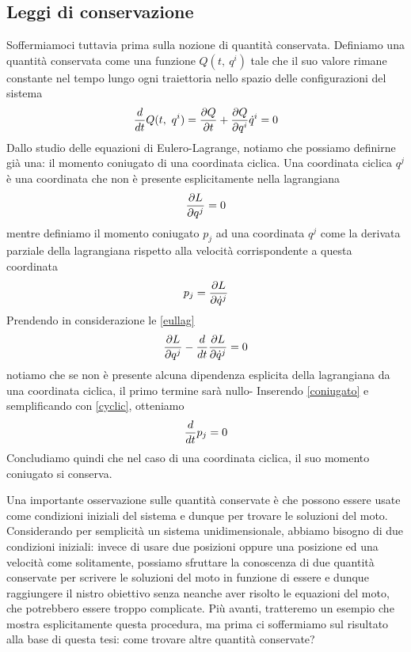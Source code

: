 \subsection{Leggi di conservazione}
    Soffermiamoci tuttavia prima sulla nozione di quantità conservata. Definiamo una quantità conservata come una funzione $Q(t, ~q^i)$ tale che il suo valore rimane constante nel tempo lungo ogni traiettoria nello spazio delle configurazioni del sistema
\begin{equation*}
    \frac{d}{dt} Q(t, ~q^i) = \frac{\partial Q}{\partial t} + \frac{\partial Q}{\partial q^i} \dot q^i = 0
\end{equation*}
    Dallo studio delle equazioni di Eulero-Lagrange, notiamo che possiamo definirne già una: il momento coniugato di una coordinata ciclica. Una coordinata ciclica $q^j$ è una coordinata che non è presente esplicitamente nella lagrangiana
\begin{equation} \label{cyclic}
    \frac{\partial L}{\partial q^j} = 0
\end{equation}
    mentre definiamo il momento coniugato $p_j$ ad una coordinata $q^j$ come la derivata parziale della lagrangiana rispetto alla velocità corrispondente a questa coordinata
\begin{equation} \label{coniugato}
    p_j = \frac{\partial L}{\partial\dot q^j}
\end{equation}
    Prendendo in considerazione le \eqref{eullag}
\begin{equation*}
    \frac{\partial L}{\partial q^j}  - \frac{d}{dt} \frac{\partial L}{\partial\dot q^j} = 0
\end{equation*}
    notiamo che se non è presente alcuna dipendenza esplicita della lagrangiana da una coordinata ciclica, il primo termine sarà nullo- Inserendo \eqref{coniugato} e semplificando con \eqref{cyclic}, otteniamo
\begin{equation*}
    \frac{d}{dt} p_j = 0
\end{equation*}
    Concludiamo quindi che nel caso di una coordinata ciclica, il suo momento coniugato si conserva. 

    Una importante osservazione sulle quantità conservate è che possono essere usate come condizioni iniziali del sistema e dunque per trovare le soluzioni del moto. Considerando per semplicità un sistema unidimensionale, abbiamo bisogno di due condizioni iniziali: invece di usare due posizioni oppure una posizione ed una velocità come solitamente, possiamo sfruttare la conoscenza di due quantità conservate per scrivere le soluzioni del moto in funzione di essere e dunque raggiungere il nistro obiettivo senza neanche aver risolto le equazioni del moto, che potrebbero essere troppo complicate. Più avanti, tratteremo un esempio che mostra esplicitamente questa procedura, ma prima ci soffermiamo sul risultato alla base di questa tesi: come trovare altre quantità conservate?

